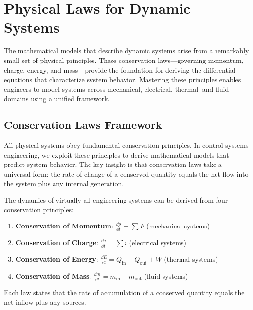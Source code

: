 
\chapter{Physical Laws for Dynamic Systems}
\label{ch:physical_laws}

The mathematical models that describe dynamic systems arise from a remarkably small set of physical principles. These conservation laws---governing momentum, charge, energy, and mass---provide the foundation for deriving the differential equations that characterize system behavior. Mastering these principles enables engineers to model systems across mechanical, electrical, thermal, and fluid domains using a unified framework.

\section{Conservation Laws Framework}
\label{sec:conservation_framework}

All physical systems obey fundamental conservation principles. In control systems engineering, we exploit these principles to derive mathematical models that predict system behavior. The key insight is that conservation laws take a universal form: the rate of change of a conserved quantity equals the net flow into the system plus any internal generation.

\begin{keyconceptbox}[title=The Four Conservation Laws]
The dynamics of virtually all engineering systems can be derived from four conservation principles:
\begin{enumerate}
    \item \textbf{Conservation of Momentum}: $\displaystyle\frac{\dd p}{\dd t} = \sum F$ (mechanical systems)
    \item \textbf{Conservation of Charge}: $\displaystyle\frac{\dd q}{\dd t} = \sum i$ (electrical systems)
    \item \textbf{Conservation of Energy}: $\displaystyle\frac{\dd E}{\dd t} = \dot{Q}_{\text{in}} - \dot{Q}_{\text{out}} + \dot{W}$ (thermal systems)
    \item \textbf{Conservation of Mass}: $\displaystyle\frac{\dd m}{\dd t} = \dot{m}_{\text{in}} - \dot{m}_{\text{out}}$ (fluid systems)
\end{enumerate}
Each law states that the rate of accumulation of a conserved quantity equals the net inflow plus any sources.
\end{keyconceptbox}

